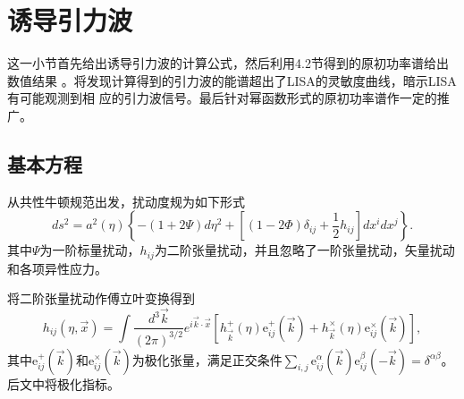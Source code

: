 \section{诱导引力波}

这一小节首先给出诱导引力波的计算公式，然后利用4.2节得到的原初功率谱给出数值结果
。将发现计算得到的引力波的能谱超出了LISA的灵敏度曲线，暗示LISA有可能观测到相
应的引力波信号。最后针对幂函数形式的原初功率谱作一定的推广。

\subsection{基本方程}
从共性牛顿规范出发，扰动度规为如下形式
\begin{equation}
  \label{eq:second-order-perturbation-metric}
  ds^2=a^2(\eta) \left\{ -(1+2\Psi)d\eta^2+{\left[(1-2\Phi)\delta_{ij}+\frac{1}{2}h_{ij}\right]}dx^{i}dx^{j} \right\}.
\end{equation}
其中$\Psi$为一阶标量扰动，$h_{ij}$为二阶张量扰动，并且忽略了一阶张量扰动，矢量扰动和各项异性应力\citep{baumann2007gravitational}。

将二阶张量扰动作傅立叶变换得到
\begin{equation}
  \label{eq:second-tensor-perturbation-in-fourier-space}
  h_{ij}(\eta, \vec{x}) = \int \frac{d^3 \vec{k}}{{\left(2\pi \right)}^{3
  /2}} e^{i \vec{k}\cdot \vec{x}}
  {\left[h^{+}_{\vec{k}}(\eta)\mathrm{e}^{+}_{ij}(\vec{k})
  +h^{\times}_{\vec{k}}(\eta)\mathrm{e}^{\times}_{ij}(\vec{k})\right]},
\end{equation}
其中$\mathrm{e}^{+}_{ij}(\vec{k})$和$\mathrm{e}^{\times}_{ij}(\vec{k})$为极化张量，满足正交条件$\sum_{i,j}
\mathrm{e}^{\alpha}_{ij}(\vec{k})\mathrm{e}^{\beta}_{ij}(-\vec{k})=\delta^{\alpha\beta}$。后文中将极化指标。

